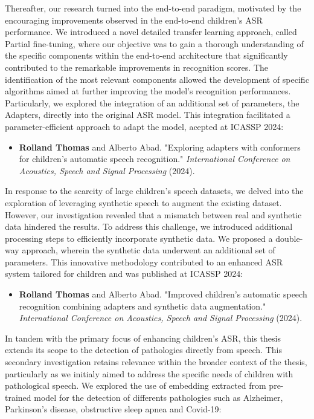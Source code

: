 Thereafter, our research turned into the end-to-end paradigm, motivated by the encouraging improvements observed in the end-to-end children's \ac{ASR} performance. We introduced a novel detailed transfer learning approach, called Partial fine-tuning, where our objective was to gain a thorough understanding of the specific components within the end-to-end architecture that significantly contributed to the remarkable improvements in recognition scores. The identification of the most relevant components allowed the development of specific algorithms aimed at further improving the model's recognition performances. Particularly, we explored the integration of an additional set of parameters, the Adapters, directly into the original \ac{ASR} model. This integration facilitated a parameter-efficient approach to adapt the model, acepted at ICASSP 2024:

\begin{itemize}
    \item \textbf{Rolland Thomas} and Alberto Abad. "Exploring adapters with conformers for children’s automatic speech recognition." \textit{ International Conference on Acoustics, Speech and Signal Processing} (2024).
\end{itemize}

In response to the scarcity of large children's speech datasets, we delved into the exploration of leveraging synthetic speech to augment the existing dataset. However, our investigation revealed that a mismatch between real and synthetic data hindered the results. To address this challenge, we introduced additional processing steps to efficiently incorporate synthetic data. We proposed a double-way approach, wherein the synthetic data underwent an additional set of parameters. This innovative methodology contributed to an enhanced \ac{ASR} system tailored for children and was published at ICASSP 2024:

\begin{itemize}
    \item \textbf{Rolland Thomas} and Alberto Abad. "Improved children’s automatic speech recognition combining adapters and synthetic data augmentation." \textit{International Conference on Acoustics, Speech and Signal Processing} (2024).
\end{itemize}

In tandem with the primary focus of enhancing children's \ac{ASR}, this thesis extends its scope to the detection of pathologies directly from speech. This secondary investigation retains relevance within the broader context of the thesis, particularly as we initialy aimed to address the specific needs of children with pathological speech. We explored the use of embedding extracted from pre-trained model for the detection of differents pathologies such as Alzheimer, Parkinson's disease, obstructive sleep apnea and Covid-19:

